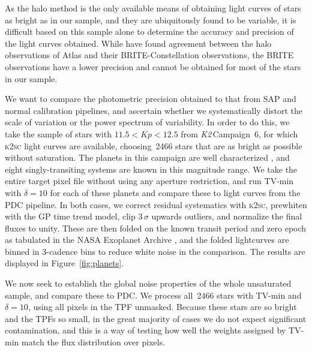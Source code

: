 \documentclass[modern]{aastex62}
\newcommand\ktwo{\emph{K2}\,}
\begin{document}
As the halo method is the only available means of obtaining light curves of stars as bright as in our sample, and they are ubiquitously found to be variable, it is difficult based on this sample alone to determine the accuracy and precision of the light curves obtained. While \citet{Kallinger2018} have found agreement between the \citet{White2017} halo observations of Atlas and their BRITE-Constellation observations, the BRITE observations have a lower precision and cannot be obtained for most of the stars in our sample. 

We want to compare the photometric precision obtained to that from SAP and normal calibration pipelines, and ascertain whether we systematically distort the scale of variation or the power spectrum of variability. In order to do this, we take the sample of stars with $11.5 <  Kp < 12.5$ from \ktwo Campaign~6, for which \textsc{k2sc} light curves are available, choosing~2466 stars that are as bright as possible without saturation. The planets in this campaign are well characterized \citep[e.g.][]{Pope2016planets}, and eight singly-transiting systems are known in this magnitude range. We take the entire target pixel file without using any aperture restriction, and run TV-min with $\delta = 10$ for each of these planets and compare these to light curves from the PDC pipeline. In both cases, we correct residual systematics with \textsc{k2sc}, prewhiten with the GP time trend model, clip $3\,\sigma$ upwards outliers, and normalize the final fluxes to unity. These are then folded on the known transit period and zero epoch as tabulated in the NASA Exoplanet Archive \citep{2013PASP..125..989A}, and the folded lightcurves are binned in 3-cadence bins to reduce white noise in the comparison. The results are displayed in Figure~\ref{fig:planets}.

\begin{figure*}
\label{fig:planets}
\caption{The eight transiting single-planet systems in \ktwo Campaign~6 in the magnitude range $11.5 < Kp < 12.5$, with PDC light curves (blue) and TV-min light curves (orange) overlaid. These have been identically \textsc{k2sc}-corrected, whitened, outlier-clipped, folded and binned as described in Section~\ref{sec:benchmarking}. The depths and shapes of the transits agree closely except for EPIC~212460519, for which the TV-min transit is slightly shallower, and EPIC~212555594, for which TV-min is significantly shallower.}
\end{figure*}

We now seek to establish the global noise properties of the whole unsaturated sample, and compare these to PDC. We process all~2466 stars with TV-min and $\delta = 10$, using all pixels in the TPF unmasked. Because these stars are so bright and the TPFs so small, in the great majority  of cases we do not expect significant contamination, and this is a way of testing how well the weights assigned by TV-min match the flux distribution over pixels.
\end{document}
